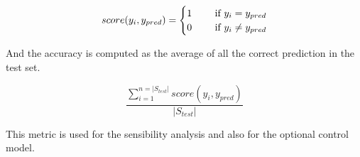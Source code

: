 \documentclass[]{article}
\begin{document}
\begin{equation}
    score(y_{i}, y_{pred}) =
    \begin{cases}
        1 & \quad \textnormal{ if } y_i = y_{pred}      \\
        0 & \quad \textnormal{ if } y_i \not = y_{pred} \\
    \end{cases}
\end{equation}

And the accuracy is computed as the average of all the correct prediction in the test set.

\begin{equation}
    \frac{\sum_{i = 1}^{n = |S_{test}|}score(y_i, y_{pred})}{|S_{test}|}
\end{equation}

This metric is used for the sensibility analysis and also for the optional control model.



\end{document}
